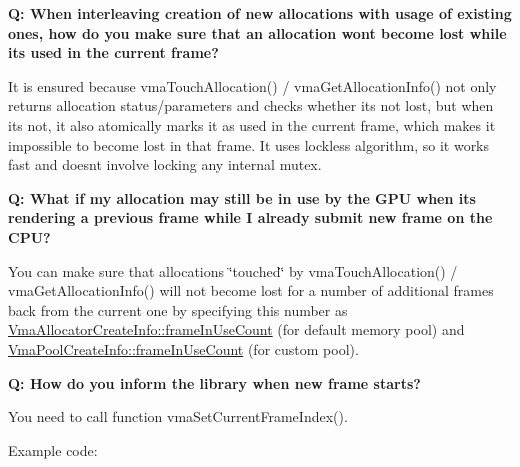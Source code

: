 {\bfseries Q\+: When interleaving creation of new allocations with usage of existing ones, how do you make sure that an allocation won\textquotesingle{}t become lost while it\textquotesingle{}s used in the current frame?}

It is ensured because vma\+Touch\+Allocation() / vma\+Get\+Allocation\+Info() not only returns allocation status/parameters and checks whether it\textquotesingle{}s not lost, but when it\textquotesingle{}s not, it also atomically marks it as used in the current frame, which makes it impossible to become lost in that frame. It uses lockless algorithm, so it works fast and doesn\textquotesingle{}t involve locking any internal mutex.

{\bfseries Q\+: What if my allocation may still be in use by the G\+PU when it\textquotesingle{}s rendering a previous frame while I already submit new frame on the C\+PU?}

You can make sure that allocations \char`\"{}touched\char`\"{} by vma\+Touch\+Allocation() / vma\+Get\+Allocation\+Info() will not become lost for a number of additional frames back from the current one by specifying this number as \hyperlink{structVmaAllocatorCreateInfo_a21ea188dd212b8171cb9ecbed4a2a3a7}{Vma\+Allocator\+Create\+Info\+::frame\+In\+Use\+Count} (for default memory pool) and \hyperlink{structVmaPoolCreateInfo_a9437e43ffbb644dbbf7fc4e50cfad6aa}{Vma\+Pool\+Create\+Info\+::frame\+In\+Use\+Count} (for custom pool).

{\bfseries Q\+: How do you inform the library when new frame starts?}

You need to call function vma\+Set\+Current\+Frame\+Index().

Example code\+:


